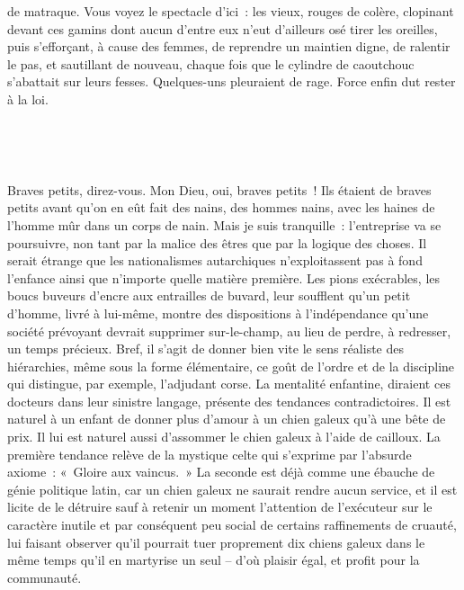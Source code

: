 \documentclass[french,twoside]{book} %
\newcommand{\astertri}{\medskip\par\centerline{\color{rubric}\large\selectfont{\syms ✻\,✻\,✻}}\medskip\par}%
\begin{document}
de matraque. Vous voyez le spectacle d’ici : les vieux, rouges de colère, clopinant devant ces gamins dont aucun d’entre eux n’eut d’ailleurs osé tirer les oreilles, puis s’efforçant, à cause des femmes, de reprendre un maintien digne, de ralentir le pas, et sautillant de nouveau, chaque fois que le cylindre de caoutchouc s’abattait sur leurs fesses. Quelques-uns pleuraient de rage. Force enfin dut rester à la loi.\par
 \par

\astertri

\noindent  \par
Braves petits, direz-vous. Mon Dieu, oui, braves petits ! Ils étaient de braves petits avant qu’on en eût fait des nains, des hommes nains, avec les haines de l’homme mûr dans un corps de nain. Mais je suis tranquille : l’entreprise va se poursuivre, non tant par la malice des êtres que par la logique des choses. Il serait étrange que les nationalismes autarchiques n’exploitassent pas à fond l’enfance ainsi que n’importe quelle matière première. Les pions exécrables, les boucs buveurs d’encre aux entrailles de buvard, leur soufflent qu’un petit d’homme, livré à lui-même, montre des dispositions à l’indépendance qu’une société prévoyant devrait supprimer sur-le-champ, au lieu de perdre, à redresser, un temps précieux. Bref, il s’agit de donner bien vite le sens réaliste des hiérarchies, même sous la forme élémentaire, ce goût de l’ordre et de la discipline qui distingue, par exemple, l’adjudant corse. La mentalité enfantine, diraient ces docteurs dans leur sinistre langage, présente des tendances contradictoires. Il est naturel à un enfant de donner plus d’amour à un chien galeux qu’à une bête de prix. Il lui est naturel aussi d’assommer le chien galeux à l’aide de cailloux. La première tendance relève de la mystique celte qui s’exprime par l’absurde axiome : « Gloire aux vaincus. » La seconde est déjà comme une ébauche de génie politique latin, car un chien galeux ne saurait rendre aucun service, et il est licite de le détruire sauf à retenir un moment l’attention de l’exécuteur sur le caractère inutile et par conséquent peu social de certains raffinements de cruauté, lui faisant observer qu’il pourrait tuer proprement dix chiens galeux dans le même temps qu’il en martyrise un seul – d’où plaisir égal, et profit pour la communauté.\par
 \par

\astertri
\end{document}
